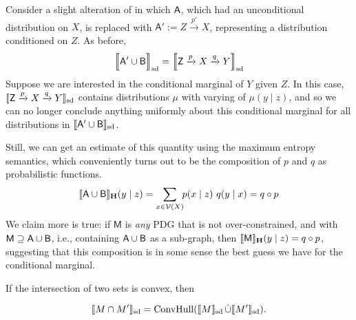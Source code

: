 \documentclass{article}
\DeclarePairedDelimiter{\SD}{\llbracket}{\rrbracket_{\text{sd}}}
\newcommand\MaxEnt{_{\mathbf H}}
\newcommand{\V}{\mathcal V}
\newcommand{\sfM}{\mathsf M}
\numberwithin{equation}{section}
\begin{document}
	\begin{example}[composition]
		Consider a slight alteration of  in which $\sf A$, which had an unconditional distribution on $X$, is replaced with $\mathsf A' := Z \xrightarrow{p'} X$, representing a distribution conditioned on $Z$. 
		As before,
		\[ \SD[\Big]{{\sf A' \cup B}} = \SD[\Big]{{\mathsf Z} \xrightarrow{p} X \xrightarrow{q} Y} \]
		Suppose we are interested in the conditional marginal of $Y$ given $Z$. In this case, $\SD{{\mathsf Z} \xrightarrow{p} X \xrightarrow{q} Y} $ contains distributions $\mu$ with varying of $\mu(y \mid z)$, and so we can no longer conclude anything uniformly about this conditional marginal for all distributions in $\SD{{\sf A' \cup B}}$. 
		
		Still, we can get an estimate of this quantity using the maximum entropy semantics, which conveniently turns out to be the composition of $p$ and $q$ as probabilistic functions.
		$$ \bbr{{\sf A \cup B}}\MaxEnt(y \mid z) = \sum_{x \in \V(X)}\!\! p (x \mid z)\ q(y \mid x) = q \circ p $$
		We claim more is true: if $\sfM$ is \emph{any} PDG that is not over-constrained, and with $\sfM \supseteq \sf A \cup B$, i.e., containing $\sf A \cup B$ as a sub-graph, then
		$ \bbr{\sfM}\MaxEnt(y \mid z) = q \circ p$,
		suggesting that this composition is in some sense the best guess we have for the conditional marginal. 
	\end{example}

	\begin{vfull}
	If the intersection of two sets is convex, then 
	\begin{conj}\label{prop:intersect-set-semantics}
		\[ \SD{M \cap M'} = \text{ConvHull}(\SD{M} \mathop{\dot\cup} \SD{M'}).\]
	\end{conj}
	\end{vfull}
	
\end{document}
